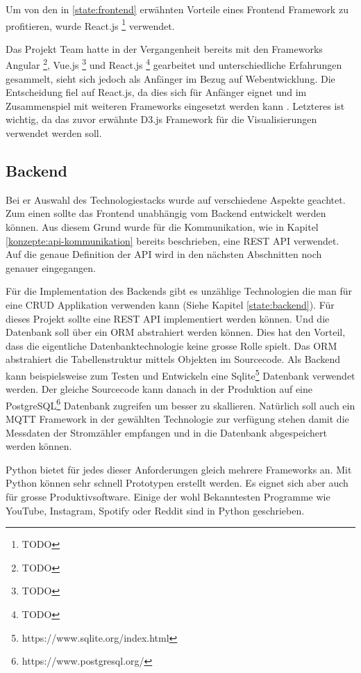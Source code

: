 Um von den in \ref{state:frontend} erwähnten Vorteile eines Frontend Framework zu profitieren,
wurde React.js \footnote{TODO} verwendet.

Das Projekt Team hatte in der Vergangenheit bereits mit den Frameworks Angular \footnote{TODO}, Vue.js \footnote{TODO} und React.js \footnote{TODO} gearbeitet
und unterschiedliche Erfahrungen gesammelt, sieht sich jedoch als Anfänger im Bezug auf Webentwicklung.
Die Entscheidung fiel auf React.js, da dies sich für Anfänger eignet und im Zusammenspiel mit weiteren Frameworks eingesetzt werden kann \parencite{react_angular_vue}.
Letzteres ist wichtig, da das zuvor erwähnte D3.js Framework für die Visualisierungen verwendet werden soll.

\subsection{Backend}
Bei er Auswahl des Technologiestacks wurde auf verschiedene Aspekte geachtet.
Zum einen sollte das Frontend unabhängig vom Backend entwickelt werden können.
Aus diesem Grund wurde für die Kommunikation, wie in Kapitel \ref{konzepte:api-kommunikation}
bereits beschrieben, eine \ac{REST} \ac{API} verwendet.
Auf die genaue Definition der \ac{API} wird in den nächsten Abschnitten noch genauer eingegangen.

Für die Implementation des Backends gibt es unzählige Technologien die man für eine \ac{CRUD}
Applikation verwenden kann (Siehe Kapitel \ref{state:backend}). Für dieses Projekt sollte
eine \ac{REST} \ac{API} implementiert werden können. Und die Datenbank soll über ein \ac{ORM}
abstrahiert werden können. Dies hat den Vorteil, dass die eigentliche Datenbanktechnologie
keine grosse Rolle spielt. Das \ac{ORM} abstrahiert die Tabellenstruktur mittels
Objekten im Sourcecode. Als Backend kann beispielsweise zum Testen und Entwickeln
eine Sqlite\footnote{https://www.sqlite.org/index.html} Datenbank verwendet werden.
Der gleiche Sourcecode kann danach in der Produktion auf eine PostgreSQL\footnote{https://www.postgresql.org/}
Datenbank zugreifen um besser zu skallieren.
Natürlich soll auch ein \ac{MQTT} Framework in der gewählten Technologie zur verfügung stehen
damit die Messdaten der Stromzähler empfangen und in die Datenbank abgespeichert werden können.

Python bietet für jedes dieser Anforderungen gleich mehrere Frameworks an. Mit Python können sehr
schnell Prototypen erstellt werden. Es eignet sich aber auch für grosse Produktivsoftware.
Einige der wohl Bekanntesten Programme wie YouTube, Instagram, Spotify oder Reddit sind
in Python geschrieben. \cite{popular_python_sw}

